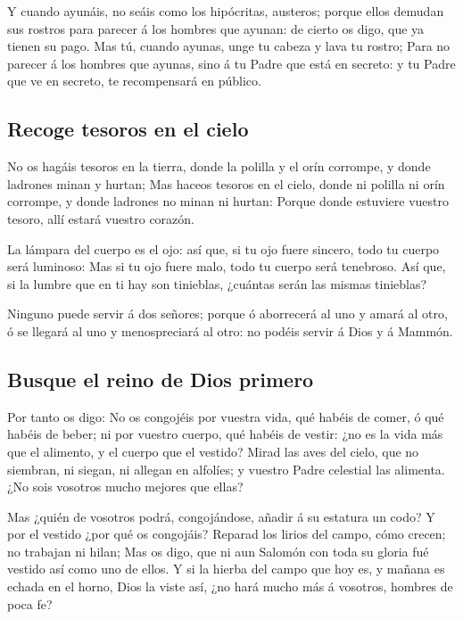  Y cuando ayunáis, no seáis como los hipócritas,
austeros; porque ellos demudan sus rostros para parecer á los hombres
que ayunan: de cierto os digo, que ya tienen su pago. 
Mas tú, cuando ayunas, unge tu cabeza y lava tu rostro; 
Para no parecer á los hombres que ayunas, sino á tu Padre que está en
secreto: y tu Padre que ve en secreto, te recompensará en público.

\hypertarget{recoge-tesoros-en-el-cielo}{%
\subsection{Recoge tesoros en el
cielo}\label{recoge-tesoros-en-el-cielo}}

 No os hagáis tesoros en la tierra, donde la polilla y el
orín corrompe, y donde ladrones minan y hurtan;  Mas
haceos tesoros en el cielo, donde ni polilla ni orín corrompe, y donde
ladrones no minan ni hurtan:  Porque donde estuviere
vuestro tesoro, allí estará vuestro corazón.

 La lámpara del cuerpo es el ojo: así que, si tu ojo
fuere sincero, todo tu cuerpo será luminoso:  Mas si tu
ojo fuere malo, todo tu cuerpo será tenebroso. Así que, si la lumbre que
en ti hay son tinieblas, ¿cuántas serán las mismas tinieblas?

 Ninguno puede servir á dos señores; porque ó aborrecerá
al uno y amará al otro, ó se llegará al uno y menospreciará al otro: no
podéis servir á Dios y á Mammón.

\hypertarget{busque-el-reino-de-dios-primero}{%
\subsection{Busque el reino de Dios
primero}\label{busque-el-reino-de-dios-primero}}

 Por tanto os digo: No os congojéis por vuestra vida, qué
habéis de comer, ó qué habéis de beber; ni por vuestro cuerpo, qué
habéis de vestir: ¿no es la vida más que el alimento, y el cuerpo que el
vestido?  Mirad las aves del cielo, que no siembran, ni
siegan, ni allegan en alfolíes; y vuestro Padre celestial las alimenta.
¿No sois vosotros mucho mejores que ellas?

 Mas ¿quién de vosotros podrá, congojándose, añadir á su
estatura un codo?  Y por el vestido ¿por qué os
congojáis? Reparad los lirios del campo, cómo crecen; no trabajan ni
hilan;  Mas os digo, que ni aun Salomón con toda su
gloria fué vestido así como uno de ellos.  Y si la hierba
del campo que hoy es, y mañana es echada en el horno, Dios la viste así,
¿no hará mucho más á vosotros, hombres de poca fe?

